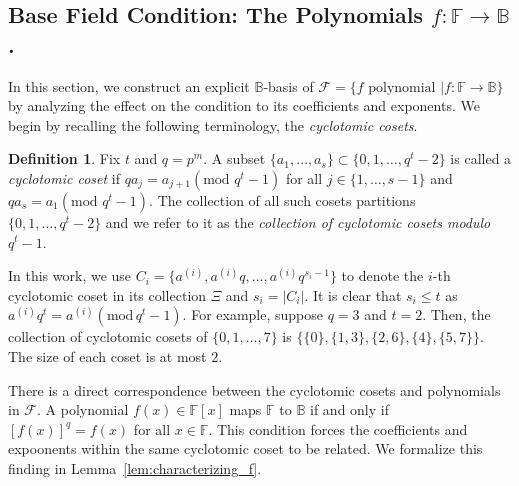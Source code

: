 \documentclass[onecolumn]{IEEEtran}
\theoremstyle{plain}
\theoremstyle{definition}
\newtheorem{definition}{Definition}
\newcommand{\FF}{\mathbb{F}}
\newcommand{\BB}{\mathbb{B}}
\newcommand{\cF}{\mathcal{F}}
\newcommand{\hanmao}[1]{{\color{magenta} (HM: #1)}}
\newcommand{\kim}[1]{{\color{blue} Kim:#1}}
\begin{document}
\subsection{Base Field Condition: The Polynomials $f:\FF\to\BB$.}\label{sec:basis_of_F}

In this section, we construct an explicit $\BB$-basis of $\cF = \{f\text{ polynomial }| f:\FF\to\BB\}$ by analyzing the effect on the condition to its coefficients and exponents. We begin by recalling the following terminology, the \textit{cyclotomic cosets}.
\begin{definition}
    Fix $t$ and $q = p^m$. A subset $\{a_1,\ldots,a_s\} \subset \{0,1,\ldots,q^t-2\}$ is called a \textit{cyclotomic coset} if $qa_j = a_{j+1}(\text{mod } q^t-1)$ for all $j\in\{1,\ldots, s-1\}$ and $qa_s = a_1(\text{mod } q^t-1)$. 
    The collection of all such cosets partitions $\{0,1,\ldots,q^t-2\}$ and we refer to it as the \textit{collection of cyclotomic cosets modulo $q^t-1$}.
\end{definition}
In this work, we use
$
C_i =\{a^{(i)},a^{(i)}q,\ldots,a^{(i)}q^{s_i-1}\}
$
to denote the $i$-th cyclotomic coset in its collection $\Xi$ and $s_i = |C_i|$. It is clear that $s_i\le t$ as $a^{(i)}q^t = a^{(i)}(\mathrm{mod}\,{q^t-1})$. For example, suppose $q = 3$ and $t=2$. Then, the collection of cyclotomic cosets of $\{0,1,\ldots, 7\}$ is $\{\{0\},\{1,3\},\{2,6\},\{4\},\{5,7\}\}$. The size of each coset is at most $2$.

There is a direct correspondence between the cyclotomic cosets and polynomials in $\cF$. A polynomial $f(x)\in\FF[x]$ maps $\FF$ to $\BB$ if and only if $[f(x)]^q = f(x)$ for all $x\in\FF$. This condition forces the coefficients and expoonents within the same cyclotomic coset to be related. We formalize this finding in Lemma~\ref{lem:characterizing_f}.
\end{document}
